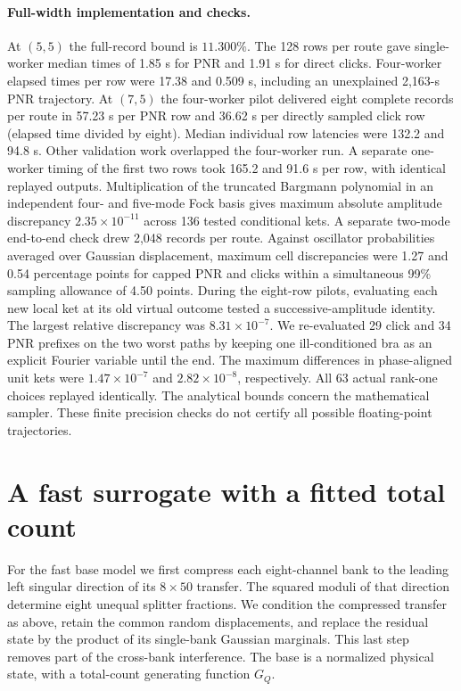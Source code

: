\documentclass[11pt]{article}
\begin{document}
\paragraph{Full-width implementation and checks.}
At $(5,5)$ the full-record bound is $11.300\%$. The 128 rows per route gave single-worker median times of 1.85 s for PNR and 1.91 s for direct clicks. Four-worker elapsed times per row were 17.38 and 0.509 s, including an unexplained 2,163-s PNR trajectory. At $(7,5)$ the four-worker pilot delivered eight complete records per route in 57.23 s per PNR row and 36.62 s per directly sampled click row (elapsed time divided by eight). Median individual row latencies were 132.2 and 94.8 s. Other validation work overlapped the four-worker run. A separate one-worker timing of the first two rows took 165.2 and 91.6 s per row, with identical replayed outputs. Multiplication of the truncated Bargmann polynomial in an independent four- and five-mode Fock basis gives maximum absolute amplitude discrepancy $2.35\times10^{-11}$ across 136 tested conditional kets. A separate two-mode end-to-end check drew 2,048 records per route. Against oscillator probabilities averaged over Gaussian displacement, maximum cell discrepancies were 1.27 and 0.54 percentage points for capped PNR and clicks within a simultaneous 99\% sampling allowance of 4.50 points. During the eight-row pilots, evaluating each new local ket at its old virtual outcome tested a successive-amplitude identity. The largest relative discrepancy was $8.31\times10^{-7}$. We re-evaluated 29 click and 34 PNR prefixes on the two worst paths by keeping one ill-conditioned bra as an explicit Fourier variable until the end. The maximum differences in phase-aligned unit kets were $1.47\times10^{-7}$ and $2.82\times10^{-8}$, respectively. All 63 actual rank-one choices replayed identically. The analytical bounds concern the mathematical sampler. These finite precision checks do not certify all possible floating-point trajectories.

\section{A fast surrogate with a fitted total count}
For the fast base model we first compress each eight-channel bank to the leading left singular direction of its $8\times 50$ transfer. The squared moduli of that direction determine eight unequal splitter fractions. We condition the compressed transfer as above, retain the common random displacements, and replace the residual state by the product of its single-bank Gaussian marginals. This last step removes part of the cross-bank interference. The base is a normalized physical state, with a total-count generating function $G_Q$.
\end{document}
